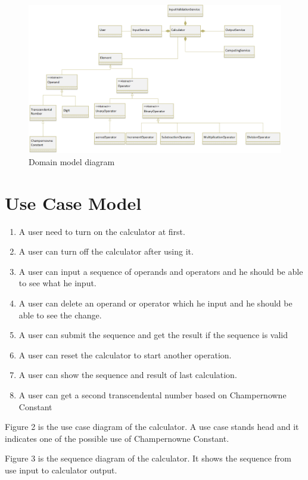 \documentclass[10pt]{article}
\begin{document}
\begin{center}
  \begin{figure}[h!]
      \centering
      \includegraphics[width=0.9\linewidth]{image/domain model.png}
      \caption{Domain model diagram}
      \label{fig:my_label}
  \end{figure}
\end{center}


\pagebreak
\section{Use Case Model}
\begin{enumerate}
    \item A user need to turn on the calculator at first.
    \item A user can turn off the calculator after using it.
    \item A user can input a sequence of operands and operators and he should be able to see what he input.
    \item A user can delete an operand or operator which he input and he should be able to see the change.
    \item A user can submit the sequence and get the result if the sequence is valid
    \item A user can reset the calculator to start another operation.
    \item A user can show the sequence and result of last calculation.
    \item A user can get a second transcendental number based on Champernowne Constant
\end{enumerate}

Figure 2 is the use case diagram of the calculator. A use case stands head and it indicates one of the possible use of Champernowne Constant. 

Figure 3 is the sequence diagram of the calculator. It shows the sequence from use input to calculator output.
\end{document}
